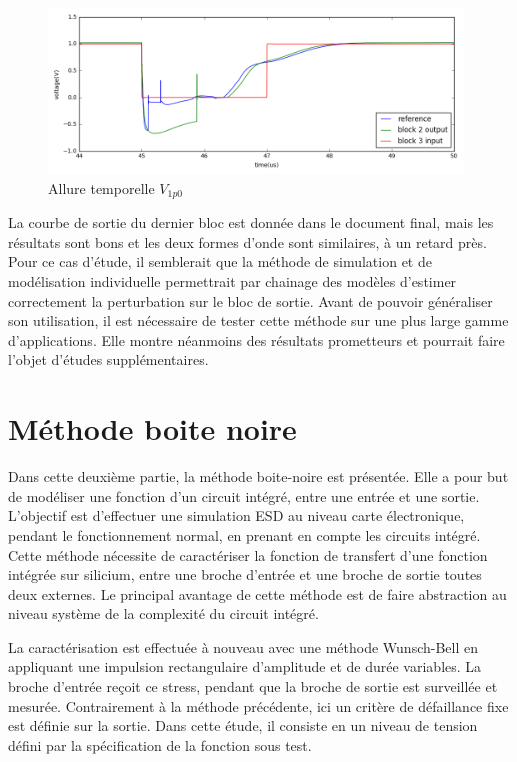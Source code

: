 \begin{figure}[!h]
  \centering
  \includegraphics[width=0.98\textwidth]{src/1/figures/simulation_comparison_block2.png}
  \caption{Allure temporelle $V_{1p0}$}
  \label{fig:sim-compare-block2}
\end{figure}

La courbe de sortie du dernier bloc est donnée dans le document final, mais les résultats sont bons et les deux formes d'onde sont similaires, à un retard près.
Pour ce cas d'étude, il semblerait que la méthode de simulation et de modélisation individuelle permettrait par chainage des modèles d'estimer correctement la perturbation sur le bloc de sortie.
Avant de pouvoir généraliser son utilisation, il est nécessaire de tester cette méthode sur une plus large gamme d'applications.
Elle montre néanmoins des résultats prometteurs et pourrait faire l'objet d'études supplémentaires.

\section{Méthode boite noire}

Dans cette deuxième partie, la méthode boite-noire est présentée.
Elle a pour but de modéliser une fonction d'un circuit intégré, entre une entrée et une sortie.
L'objectif est d'effectuer une simulation ESD au niveau carte électronique, pendant le fonctionnement normal, en prenant en compte les circuits intégré.
Cette méthode nécessite de caractériser la fonction de transfert d'une fonction intégrée sur silicium, entre une broche d'entrée et une broche de sortie toutes deux externes.
Le principal avantage de cette méthode est de faire abstraction au niveau système de la complexité du circuit intégré.

La caractérisation est effectuée à nouveau avec une méthode Wunsch-Bell \cite{wunsch-bell} en appliquant une impulsion rectangulaire d'amplitude et de durée variables.
La broche d'entrée reçoit ce stress, pendant que la broche de sortie est surveillée et mesurée.
Contrairement à la méthode précédente, ici un critère de défaillance fixe est définie sur la sortie.
Dans cette étude, il consiste en un niveau de tension défini par la spécification de la fonction sous test.

